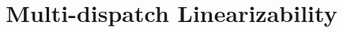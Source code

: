 \usepackage{filecontents}
\usepackage{float}
\usepackage{graphicx}
\usepackage[font=small,skip=1pt]{caption}

\usepackage{algorithmicx}
\usepackage[linesnumbered,ruled]{algorithm2e}
\usepackage{multicol}





\date{}

\title{\Large \bf Multi-dispatch Linearizability}


\maketitle










